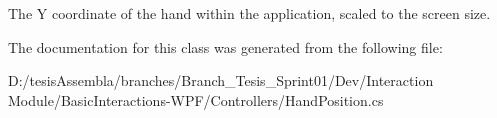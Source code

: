 The Y coordinate of the hand within the application, scaled to the screen size. 



The documentation for this class was generated from the following file\-:\begin{DoxyCompactItemize}
\item 
D\-:/tesis\-Assembla/branches/\-Branch\-\_\-\-Tesis\-\_\-\-Sprint01/\-Dev/\-Interaction Module/\-Basic\-Interactions-\/\-W\-P\-F/\-Controllers/Hand\-Position.\-cs\end{DoxyCompactItemize}
